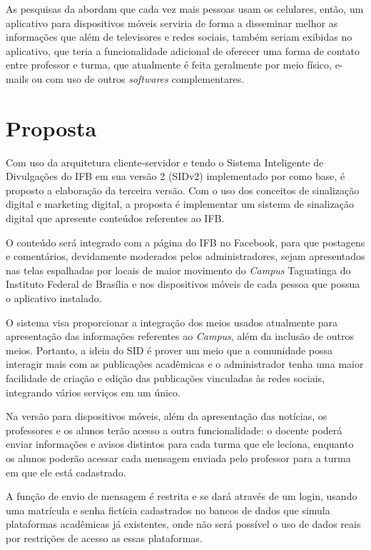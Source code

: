 As pesquisas da \citet{emarketer} abordam que cada vez mais pessoas usam os celulares, então, um aplicativo para dispositivos móveis serviria de forma a disseminar melhor as informações que além de televisores e redes sociais, também seriam exibidas no aplicativo, que teria a funcionalidade adicional de oferecer uma forma de contato entre professor e turma, que atualmente é feita geralmente por meio físico, e-mails ou com uso de outros \textit{softwares} complementares.

\section{Proposta}
Com uso da arquitetura cliente-servidor e tendo o Sistema Inteligente de Divulgações do IFB em sua versão 2 (SIDv2) implementado por \citet{sobrinho2017} como base, é proposto a elaboração da terceira versão. Com o uso dos conceitos de sinalização digital e marketing digital, a proposta é implementar um sistema de sinalização digital que apresente conteúdos referentes ao IFB. 

O conteúdo será integrado com a página do IFB no Facebook, para que postagens e comentários, devidamente moderados pelos administradores, sejam apresentados nas telas espalhadas por locais de maior movimento do \textit{Campus} Taguatinga do Instituto Federal de Brasília e nos dispositivos móveis de cada pessoa que possua o aplicativo instalado. 

O sistema visa proporcionar a integração dos meios usados atualmente para apresentação das informações referentes ao \textit{Campus}, além da inclusão de outros meios. Portanto, a ideia do SID é prover um meio que a comunidade possa interagir mais com as publicações acadêmicas e o administrador tenha uma maior facilidade de criação e edição das publicações vinculadas às redes sociais, integrando vários serviços em um único.

Na versão para dispositivos móveis, além da apresentação das notícias, os professores e os alunos terão acesso a outra funcionalidade: o docente poderá enviar informações e avisos distintos para cada turma que ele leciona, enquanto os alunos poderão acessar cada mensagem enviada pelo professor para a turma em que ele está cadastrado.

A função de envio de mensagem é restrita e se dará através de um login, usando uma matrícula e senha fictícia cadastrados no bancos de dados que simula plataformas acadêmicas já existentes, onde não será possível o uso de dados reais por restrições de acesso as essas plataformas.

